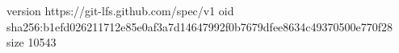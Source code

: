 version https://git-lfs.github.com/spec/v1
oid sha256:b1efd026211712e85e0af3a7d14647992f0b7679dfee8634c49370500e770f28
size 10543
